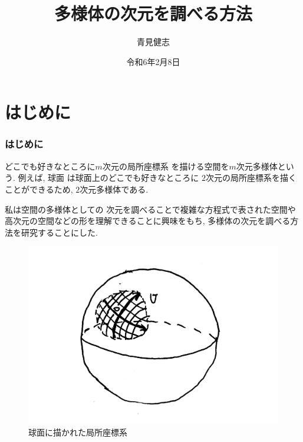\documentclass[dvipdfmx,cjk]{beamer}
\theoremstyle{definition}
\begin{document}
\title[多様体の次元を調べる方法]{多様体の次元を調べる方法} 
\author[青見健志]{青見健志}            %
\date{令和6年2月8日}

\begin{frame}                  %
\titlepage                     %
\end{frame}

\begin{frame}                  %
\tableofcontents
\end{frame}

\section{はじめに}
\begin{frame}
\frametitle{はじめに} 
どこでも好きなところに$m$次元の局所座標系
を描ける空間を$m$次元多様体という. 例えば, 球面
は球面上のどこでも好きなところに
$2$次元の局所座標系を描くことができるため, 
$2$次元多様体である.  

私は空間の多様体としての
次元を調べることで複雑な方程式で表された空間や
高次元の空間などの形を理解できることに興味をもち, 
多様体の次元を調べる方法を研究することにした. 
  \begin{figure}[]
    \centering
    \includegraphics[keepaspectratio, scale=0.2]
         {CoSysInS2.pdf}
    \caption{球面に描かれた局所座標系}
    \label{CoSysInS2}
   \end{figure}
\end{frame}
\end{document}
